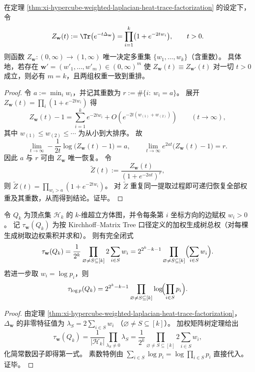 \begin{theorem}\label{thm:xi-hypercube-heat-trace-weight-rigidity}
在定理 \ref{thm:xi-hypercube-weighted-laplacian-heat-trace-factorization} 的设定下，令
\[
Z_{\mathbf w}(t):=\Tr\bigl(e^{-t\Delta_{\mathbf w}}\bigr)=\prod_{i=1}^{k}\bigl(1+e^{-2tw_i}\bigr),\qquad t>0.
\]
则函数 \(Z_{\mathbf w}:(0,\infty)\to(1,\infty)\) 唯一决定多重集 \(\{w_1,\dots,w_k\}\)（含重数）。
具体地，若存在 \(\mathbf w'=(w'_1,\dots,w'_m)\in(0,\infty)^m\) 使 \(Z_{\mathbf w}(t)\equiv Z_{\mathbf w'}(t)\) 对一切 \(t>0\) 成立，则必有 \(m=k\)，且两组权重一致到重排。
\end{theorem}
\begin{proof}
令 \(a:=\min_i w_i\)，并记其重数为 \(r:=\#\{i:\ w_i=a\}\)。
展开
\(
Z_{\mathbf w}(t)=\prod_i(1+e^{-2tw_i})
\)
得
\[
Z_{\mathbf w}(t)-1=\sum_{i=1}^{k}e^{-2tw_i}+O\!\left(e^{-2t(w_{(1)}+w_{(2)})}\right)\qquad(t\to\infty),
\]
其中 \(w_{(1)}\le w_{(2)}\le\cdots\) 为从小到大排序。
故
\[
\lim_{t\to\infty}-\frac{1}{2t}\log\bigl(Z_{\mathbf w}(t)-1\bigr)=a,
\qquad
\lim_{t\to\infty}e^{2at}\bigl(Z_{\mathbf w}(t)-1\bigr)=r.
\]
因此 \(a\) 与 \(r\) 可由 \(Z_{\mathbf w}\) 唯一恢复。
令
\[
\widetilde Z(t):=\frac{Z_{\mathbf w}(t)}{(1+e^{-2at})^{r}},
\]
则 \(\widetilde Z(t)=\prod_{w_i>a}(1+e^{-2tw_i})\)。
对 \(\widetilde Z\) 重复同一提取过程即可递归恢复全部权重及其重数，从而得到结论。证毕。
\end{proof}

\begin{theorem}[加权超立方体生成树的谱乘积闭式]\label{thm:xi-hypercube-weighted-spanning-tree-spectrum-product}
令 \(Q_k\) 为顶点集 \(\mathcal H_k\) 的 \(k\)-维超立方体图，并令每条第 \(i\) 坐标方向的边赋权 \(w_i>0\)。
记 \(\tau_{\mathbf w}(Q_k)\) 为按 Kirchhoff--Matrix Tree 口径定义的加权生成树总权（对每棵生成树取边权乘积并求和）。
则有完全闭式
\[
\tau_{\mathbf w}(Q_k)
=\frac{1}{2^k}\prod_{\varnothing\neq S\subseteq[k]}2\sum_{i\in S}w_i
=2^{2^k-k-1}\prod_{\varnothing\neq S\subseteq[k]}\Bigl(\sum_{i\in S}w_i\Bigr).
\]
若进一步取 \(w_i=\log p_i\)，则
\[
\tau_{\log p}(Q_k)
=2^{2^k-k-1}\prod_{\varnothing\neq S\subseteq[k]}\log\!\Bigl(\prod_{i\in S}p_i\Bigr).
\]
\end{theorem}
\begin{proof}
由定理 \ref{thm:xi-hypercube-weighted-laplacian-heat-trace-factorization}，
\(\Delta_{\mathbf w}\) 的非零特征值为
\(
\lambda_S=2\sum_{i\in S}w_i
\)
（\(\varnothing\neq S\subseteq[k]\)）。
加权矩阵树定理给出
\[
\tau_{\mathbf w}(Q_k)
=\frac{1}{|\mathcal H_k|}\prod_{\lambda_S\neq 0}\lambda_S
=\frac{1}{2^k}\prod_{\varnothing\neq S\subseteq[k]}2\sum_{i\in S}w_i,
\]
化简常数因子即得第一式。
素数特例由
\(
\sum_{i\in S}\log p_i=\log\prod_{i\in S}p_i
\)
直接代入。证毕。
\end{proof}

